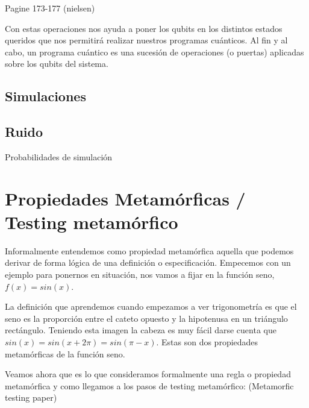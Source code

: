  Pagine 173-177 (nielsen)

\vspace{20pt}
 Con estas operaciones nos ayuda a poner los qubits en los distintos estados queridos que nos permitirá realizar nuestros programas cuánticos. Al fin y al cabo, un programa cuántico es una sucesión de operaciones (o puertas) aplicadas sobre los qubits del sistema. \newline

\subsection{Simulaciones}

\subsection{Ruido}
Probabilidades de simulación \n

\section{Propiedades Metamórficas / Testing metamórfico}

Informalmente entendemos como propiedad metamórfica aquella que podemos derivar de forma lógica de una definición o especificación. Empecemos con un ejemplo para ponernos en situación, nos vamos a fijar en la función seno, $f(x)=sin(x)$.\newline

La definición que aprendemos cuando empezamos a ver trigonometría es que el seno es la proporción entre el cateto opuesto y la hipotenusa en un triángulo rectángulo. Teniendo esta imagen la cabeza es muy fácil darse cuenta que $sin(x)=sin(x + 2\pi)=sin(\pi-x)$. Estas son dos propiedades metamórficas de la función seno. \newline

Veamos ahora que es lo que consideramos formalmente una regla o propiedad metamórfica y como llegamos a los pasos de testing metamórfico: (Metamorfic testing paper)

